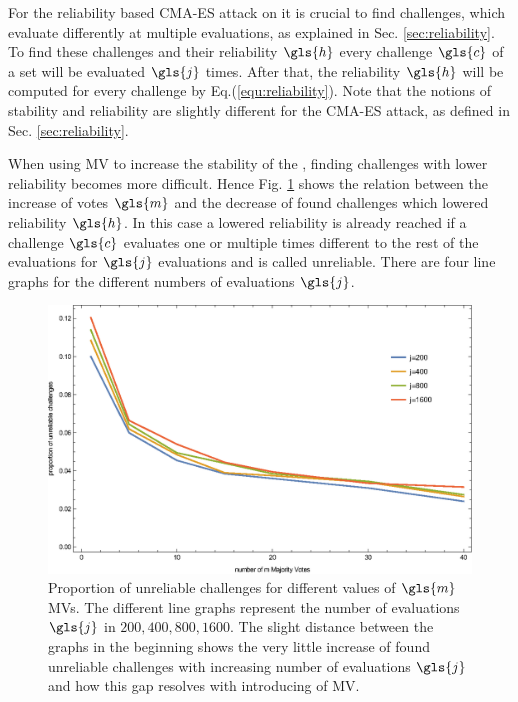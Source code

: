 For the reliability based \ac{CMA-ES} attack on \apufs it is crucial to find challenges, which evaluate differently at multiple evaluations, as explained in Sec. \ref{sec:reliability}.
To find these challenges and their reliability $\gls{h}$ every challenge $\gls{c}$ of a set will be evaluated $\gls{j}$ times.
After that, the reliability $\gls{h}$ will be computed for every challenge by Eq.(\ref{equ:reliability}).
Note that the notions of stability and reliability are slightly different for the \ac{CMA-ES} attack, as defined in Sec. \ref{sec:reliability}.

When using \ac{MV} to increase the stability of the \apuf, finding challenges with lower reliability becomes more difficult.
Hence Fig. \ref{fig:cmamajorityvotemeasurementrelation} shows the relation between the increase of votes $\gls{m}$ and the decrease of found challenges which lowered reliability $\gls{h}$.
In this case a lowered reliability is already reached if a challenge $\gls{c}$ evaluates one or multiple times different to the rest of the evaluations for $\gls{j}$ evaluations and is called unreliable. %
There are four line graphs for the different numbers of evaluations $\gls{j}$.

\begin{figure}[ht]
\includegraphics[width=1.00\textwidth]{images/mv-measurements-unstableChallenges.eps}
\caption[Proportion of unreliable challenges]{Proportion of unreliable challenges for different values of $\gls{m}$ \acp{MV}. The different line graphs represent the number of evaluations $\gls{j}$ in $200, 400, 800, 1600$. The slight distance between the graphs in the beginning shows the very little increase of found unreliable challenges with increasing number of evaluations $\gls{j}$ and how this gap resolves with introducing of \ac{MV}.}
\label{fig:cmamajorityvotemeasurementrelation}
\end{figure}

